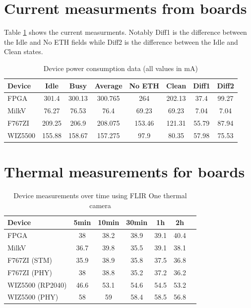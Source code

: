 \section{Current measurments from boards}
\label{app:current_measurements}

Table \ref{tab:power_consumption} shows the current measurments. Notably Diff1 is the difference between the Idle and No ETH fields while Diff2 is the difference between the Idle and Clean states.

\begin{table}[ht]
    \centering
    \caption{Device power consumption data (all values in mA)}
    \label{tab:power_consumption}
    \begin{tabular}{lccccccc}
    \toprule
    Device    & Idle  & Busy  & Average  & No ETH  & Clean  & Diff1  & Diff2 \\
    \midrule
    FPGA      & 301.4     & 300.13    & 300.765      & 264         & 202.13           & 37.4     & 99.27       \\
    MilkV     & 76.27     & 76.53     & 76.4         & 69.23       & 69.23            & 7.04     & 7.04       \\
    F767ZI    & 209.25    & 206.9     & 208.075      & 153.46      & 121.31           & 55.79    & 87.94       \\
    WIZ5500   & 155.88    & 158.67    & 157.275      & 97.9        & 80.35            & 57.98    & 75.53       \\
    \bottomrule
    \end{tabular}
\end{table}


\section{Thermal measurements for boards}

\begin{table}[ht]
    \centering
    \caption{Device measurements over time using FLIR One thermal camera}
    \label{tab:measurements}
    \begin{tabular}{lcccccc}
    \toprule
    Device & 5min & 10min & 30min & 1h & 2h \\
    \midrule
    FPGA & 38 & 38.2 & 38.9 & 39.1 & 40.4 \\
    MilkV & 36.7 & 39.8 & 35.5 & 39.1 & 38.1 \\
    F767ZI (STM) & 35.9 & 38.9 & 35.8 & 37.5 & 36.8 \\
    F767ZI (PHY) & 38 & 38.8 & 35.2 & 37.2 & 36.2 \\
    WIZ5500 (RP2040) & 46.6 & 53.1 & 54.6 & 54.5 & 53.2 \\
    WIZ5500 (PHY) & 58 & 59 & 58.4 & 58.5 & 56.8 \\
    \bottomrule
\end{tabular}
\end{table}

